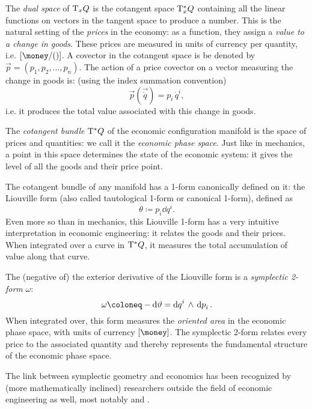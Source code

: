 The \emph{dual space} of \(\mathrm{T}_{x} Q\) is the cotangent space \(\mathrm{T}_{x}^*Q\) containing all the linear functions on vectors in the tangent space to produce a number. This is the natural setting of the \emph{prices} in the economy: as a function, they assign a \emph{value to a change in goods}. These prices are measured in units of currency per quantity, i.e. \(\qty[\si{\money \per \quantity}]\). A covector in the cotangent space is be denoted by \(\vec{p} = (p_1, p_2, \ldots, p_n)\). The action of a price covector on a vector measuring the change in goods is: (using the index summation convention)
\begin{equation}
    \vec{p}(\vec{\dot{q}}) = p_i\,\dot{q}^i,
\end{equation}
i.e. it produces the total value associated with this change in goods.

The \emph{cotangent bundle} \(\mathrm{T}^*Q\) of the economic configuration manifold is the space of prices and quantities: we call it the \emph{economic phase space}. Just like in mechanics, a point in this space determines the state of the economic system: it gives the level of all the goods and their price point.

The cotangent bundle of any manifold has a 1-form canonically defined on it: the Liouville form (also called tautological 1-form or canonical 1-form), defined as
\begin{equation} 
    \theta \coloneq  p_i \dd{q}^i.
\end{equation}
Even more so than in mechanics, this Liouville 1-form has a very intuitive interpretation in economic engineering: it relates the goods and their prices. When integrated over a curve in \(\mathrm{T}^*Q\), it measures the total accumulation of value along that curve.

The (negative of) the exterior derivative of the Liouville form is a \emph{symplectic 2-form} \(\omega\):
\begin{equation}
    \omega \coloneq -\dd{\theta} = \wedgep{\dd{q}^i}{\dd{p}_i}.
\end{equation}
When integrated over, this form measures the \emph{oriented area} in the economic phase space, with units of currency \([\si{\money}]\). The symplectic 2-form relates every price to the associated quantity and thereby represents the fundamental structure of the economic phase space.  

The link between symplectic geometry and economics has been recognized by (more mathematically inclined) researchers outside the field of economic engineering as well, most notably \citet{Russell2011} and \citet{Swierstra2014}.

